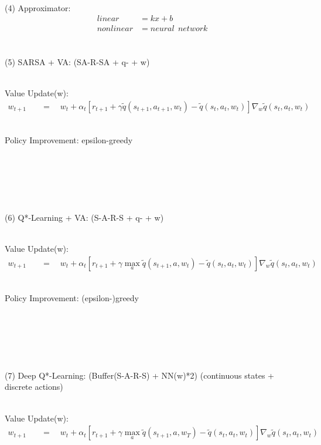 \documentclass{article}
\begin{document}
~ \\[3pt]
(4) Approximator: 
\begin{align*}
    linear    &= kx + b \\[3pt]
    nonlinear &= neural \ \ network \\[3pt]
\end{align*}


\newpage


~ \\[3pt]
(5) SARSA + VA: \qquad (SA-R-SA + q- + w) 

~ \\[3pt]
Value Update(w): 
\begin{align*}
    w_{t+1} & 
            \quad = \quad w_{t} + \alpha_{t} 
            [ r_{t+1} + \gamma \tilde{q}(s_{t+1}, a_{t+1}, w_{t}) 
            - \tilde{q}(s_{t}, a_{t}, w_{t}) ] 
            \nabla_{w} \tilde{q}(s_{t}, a_{t}, w_{t}) 
\end{align*}

~ \\[3pt]
Policy Improvement: epsilon-greedy


~ \\[3pt]
~ \\[3pt]
~ \\[3pt]
~ \\[3pt]
~ \\[3pt]
(6) Q*-Learning + VA: \qquad (S-A-R-S + q- + w) 

~ \\[3pt]
Value Update(w): 
\begin{align*}
    w_{t+1} & 
            \quad = \quad w_{t} + \alpha_{t} 
            [ r_{t+1} + \gamma \max_{a} \tilde{q}(s_{t+1}, a, w_{t}) 
            - \tilde{q}(s_{t}, a_{t}, w_{t}) ] 
            \nabla_{w} \tilde{q}(s_{t}, a_{t}, w_{t}) 
\end{align*}

~ \\[3pt]
Policy Improvement: (epsilon-)greedy 


~ \\[3pt]
~ \\[3pt]
~ \\[3pt]
~ \\[3pt]
~ \\[3pt]
(7) Deep Q*-Learning: \qquad (Buffer(S-A-R-S) + NN(w)*2) 
\quad (continuous states + discrete actions)

~ \\[3pt]
Value Update(w): 
\begin{align*}
    w_{t+1} & 
            \quad = \quad w_{t} + \alpha_{t} 
            [ r_{t+1} + \gamma \max_{a} \tilde{q}(s_{t+1}, a, w_{T}) 
            - \tilde{q}(s_{t}, a_{t}, w_{t}) ] 
            \nabla_{w} \tilde{q}(s_{t}, a_{t}, w_{t}) 
\end{align*}
\end{document}
